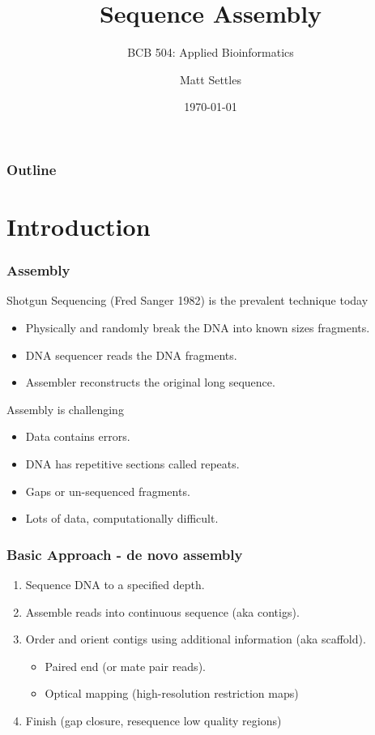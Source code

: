 \documentclass[pdf]{beamer}
\begin{document}
\title[Sequence Assembly]{Sequence Assembly}
\subtitle{BCB 504: Applied Bioinformatics\\}
\author[Matt Settles]{Matt Settles}
\date{\today}


\begin{frame}[plain]
  \titlepage
\end{frame}


\begin{frame}[plain] 
  \frametitle{Outline}
  \tableofcontents
\end{frame}

\section{Introduction}
\begin{frame}
  \frametitle{Assembly}
Shotgun Sequencing (Fred Sanger 1982) is the prevalent technique today
\begin{itemize}
\item Physically and randomly break the DNA into known sizes fragments.
\item DNA sequencer reads the DNA fragments.
\item Assembler reconstructs the original long sequence.
\end{itemize}
Assembly is challenging
\begin{itemize}
\item Data contains errors.
\item DNA has repetitive sections called repeats.
\item Gaps or un-sequenced fragments.
\item Lots of data, computationally difficult.
\end{itemize}
\end{frame}

\begin{frame}
\frametitle{Basic Approach - de novo assembly}
\begin{enumerate}
\item Sequence DNA to a specified depth.
\item Assemble reads into continuous sequence (aka contigs).
\item Order and orient contigs using additional information (aka scaffold).
\begin{itemize}
\item Paired end (or mate pair reads).
\item Optical mapping (high-resolution restriction maps)
\end{itemize}
\item Finish (gap closure, resequence low quality regions)
\end{enumerate}
\end{frame}
\end{document}
